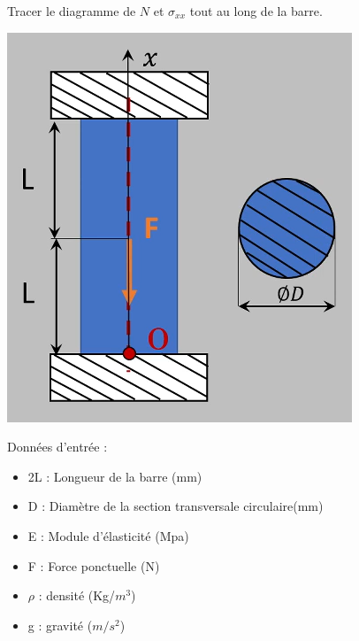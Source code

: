 \documentclass[lecture.tex]{subfiles}
\begin{document}
\exercice{}

Tracer le diagramme de $N$ et $\sigma_{xx}$ tout au long de la barre.

\begin{center}
  \includegraphics[scale=0.5]{figA0037.png}
\end{center}

Données d'entrée :

\begin{itemize}[label = , font = \tiny]
  \item 2L : Longueur de la barre (mm)
  \item D : Diamètre de la section transversale circulaire(mm)
  \item E : Module d'élasticité (Mpa)
  \item F : Force ponctuelle (N)
  \item $\rho$ : densité (Kg/$m^{3}$)
  \item g : gravité ($m / s^2$)
\end{itemize}


\finexercice
\end{document}
